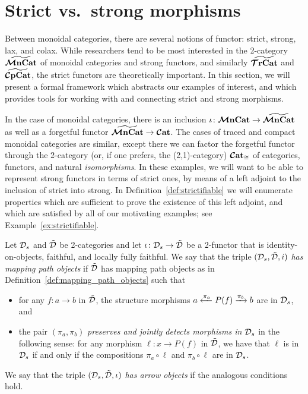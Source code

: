 \documentclass[11pt,oneside,article]{memoir}
\begin{document}
\section{Strict vs.\ strong morphisms}
  \label{sec:strict_vs_strong}

Between monoidal categories, there are several notions of functor: strict, strong, lax, and colax.
While researchers tend to be most interested in the 2-category $\widetilde{\bm{\mathcal{M}}\mathbf{nCat}}$ of monoidal
categories and strong functors, and similarly $\widetilde{\bm{\mathcal{T}}\mathbf{rCat}}$ and $\widetilde{\bm{\mathcal{C}}\mathbf{pCat}}$, the strict
functors are theoretically important. In this section, we will present a formal framework which
abstracts our examples of interest, and which provides tools for working with and connecting strict
and strong morphisms.

In the case of monoidal categories, there is an inclusion $\iota\colon\bm{\mathcal{M}}\mathbf{nCat}\to\widetilde{\bm{\mathcal{M}}\mathbf{nCat}}$ as
well as a forgetful functor $\widetilde{\bm{\mathcal{M}}\mathbf{nCat}}\to\bm{\mathcal{C}}\mathbf{at}$. The cases of traced and compact monoidal
categories are similar, except there we can factor the forgetful functor through the 2-category (or,
if one prefers, the (2,1)-category) $\bm{\mathcal{C}}\mathbf{at}_{\cong}$ of categories, functors, and natural
\emph{isomorphisms}. In these examples, we will want to be able to represent strong functors in
terms of strict ones, by means of a left adjoint to the inclusion of strict into strong. In
Definition~\ref{def:strictifiable} we will enumerate properties which are sufficient to prove the
existence of this left adjoint, and which are satisfied by all of our motivating examples; see
Example~\ref{ex:strictifiable}.

\begin{definition}
    \label{def:preserve_jdetect_strictness}
  Let $\mathcal{D}_s$ and $\tilde{\mathcal{D}}$ be 2-categories and let $\iota\colon\mathcal{D}_s\to\tilde{\mathcal{D}}$ be a
  2-functor that is identity-on-objects, faithful, and locally fully faithful. We say that the
  triple $(\mathcal{D}_s,\tilde{\mathcal{D}},i)$ \emph{has mapping path objects} if $\tilde{\mathcal{D}}$ has mapping path
  objects as in Definition~\ref{def:mapping_path_objects} such that
  \begin{itemize}
    \item for any $f\colon a\to b$ in $\tilde{\mathcal{D}}$, the structure morphisms
      $a\xleftarrow{\pi_a}P(f)\xrightarrow{\pi_b}b$ are in $\mathcal{D}_s$, and
    \item the pair $(\pi_a,\pi_b)$ \emph{preserves and jointly detects morphisms in $\mathcal{D}_s$} in
      the following sense: for any morphism $\ell\colon x\to P(f)$ in $\tilde{\mathcal{D}}$, we have that
      $\ell$ is in $\mathcal{D}_s$ if and only if the compositions $\pi_a\circ\ell$ and $\pi_b\circ\ell$
      are in $\mathcal{D}_s$.
  \end{itemize}
  We say that the triple $(\mathcal{D}_s,\tilde{\mathcal{D}},\iota)$ \emph{has arrow objects} if the analogous
  conditions hold.
\end{definition}
\end{document}
